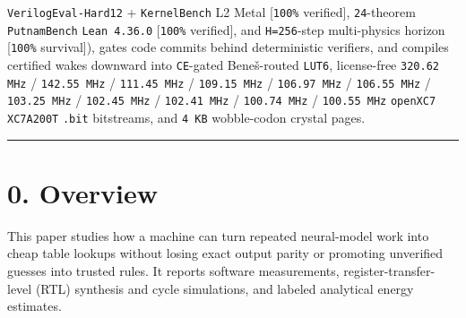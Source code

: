 \documentclass[10pt]{article}
\begin{document}
{\texttt{VerilogEval-Hard12} + \texttt{KernelBench} L2 Metal [\texttt{100\%} verified], \texttt{24}-theorem \texttt{PutnamBench} \texttt{Lean 4.36.0} [\texttt{100\%} verified], and \texttt{H=256}-step multi-physics horizon [\texttt{100\%} survival]), gates code commits behind deterministic verifiers, and compiles certified wakes downward into \texttt{CE}-gated Bene\v{s}-routed \texttt{LUT6}, license-free \texttt{320.62 MHz} / \texttt{142.55 MHz} / \texttt{111.45 MHz} / \texttt{109.15 MHz} / \texttt{106.97 MHz} / \texttt{106.55 MHz} / \texttt{103.25 MHz} / \texttt{102.45 MHz} / \texttt{102.41 MHz} / \texttt{100.74 MHz} / \texttt{100.55 MHz} \texttt{openXC7} \texttt{XC7A200T} \texttt{.bit} bitstreams, and \texttt{4 KB} wobble-codon crystal pages.
}
\vspace{6pt}

{
\small
\setcounter{tocdepth}{2}
\tableofcontents
}
\vspace{4pt}
\hrule
\vspace{8pt}

\section{0. Overview}\label{overview}

This paper studies how a machine can turn repeated neural-model work into cheap table lookups without losing exact output parity or promoting unverified guesses into trusted rules. It reports software measurements, register-transfer-level (RTL) synthesis and cycle simulations, and labeled analytical energy estimates.
\end{document}
